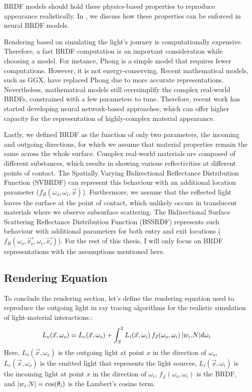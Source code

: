 BRDF models should hold these physics-based properties to reproduce appearance realistically. In \citeauthor{Chenliang's paper} \cite{Chenliang's paper}, we discuss how these properties can be enforced in neural BRDF models. 

Rendering based on simulating the light's journey is computationally expensive. Therefore, a fast BRDF computation is an important consideration while choosing a model. For instance, Phong is a simple model that requires fewer computations. However, it is not energy-conserving. Recent mathematical models, such as GGX, have replaced Phong due to more accurate representations. Nevertheless, mathematical models still oversimplify the complex real-world BRDFs, constrained with a few parameters to tune. Therefore, recent work has started developing neural network-based approaches, which can offer higher capacity for the representation of highly-complex material appearance.

Lastly, we defined BRDF as the function of only two parameters, the incoming and outgoing directions, for which we assume that material properties remain the same across the whole surface. Complex real-world materials are composed of different substances, which results in showing various reflectivities at different points of contact. The Spatially Varying Bidirectional Reflectance Distribution Function (SVBRDF) can represent this behaviour with an additional location parameter ($f_R(\omega_o, \omega_i,  \vec{x})$). Furthermore, we assume that the reflected light leaves the surface at the point of contact, which unlikely occurs in translucent materials where we observe subsurface scattering. The Bidirectional Surface Scattering Reflectance Distribution Function (BSSRDF) represents such behaviour with additional parameters for both entry and exit locations ($f_R(\omega_o, \vec{x_o}, \omega_i,  \vec{x_i})$). For the rest of this thesis, I will only focus on BRDF representations with the assumptions mentioned here.

\subsection{Rendering Equation}

To conclude the rendering section, let's define the rendering equation used to reproduce the outgoing light in ray tracing algorithms for the realistic simulation of light-material interactions.:
\begin{equation}
L_o(\vec{x}, \omega_o) = L_e(\vec{x}, \omega_o)  +  \int_S^2 L_i(\vec{x}, \omega_i) \, f_{\vec{x}}(\omega_o,  \omega_i) \, \lvert w_i . N\rvert d\omega_i
\label{eqn:rendering-eqn}
\end{equation}
Here, $L_o(\vec{x}, \omega_o) $ is the outgoing light at point $x$ in the direction of $\omega_o$, $L_e(\vec{x}, \omega_o)$ is the emitted light that represents the light sources, $L_i(\vec{x}, \omega_i) $ is the incoming light at point $x$ in the direction of $\omega_i$, $f_{\vec{x}}(\omega_o,  \omega_i)$ is the BRDF, and $\lvert w_i . N\rvert = \cos(\theta_i)$ is the Lambert's cosine term.


